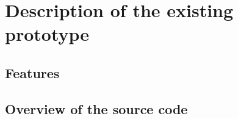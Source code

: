 \chapter{Description of the existing prototype}

\section{Features}

\section{Overview of the source code}

